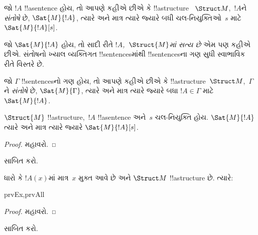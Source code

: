 \documentclass[../../../include/open-logic-section]{subfiles}
\begin{document}
\begin{defn}
જો $!A$ !!a{sentence} હોય, તો આપણે કહીએ છીએ કે !!a{structure}
~$\Struct M$,~$!A$ને \emph{સંતોષે} છે, $\Sat{M}{!A}$, ત્યારે અને માત્ર
ત્યારે જ્યારે બધી ચલ-નિયુક્તિઓ~$s$ માટે $\Sat{M}{!A}[s]$.
\end{defn}

જો $\Sat{M}{!A}$ હોય, તો સાદી રીતે \emph{$!A$,~$\Struct{M}$માં સત્ય
છે} એમ પણ કહીએ છીએ. સંતોષનો ખ્યાલ વ્યક્તિગત !!{sentence}sમાંથી
!!{sentence}sના ગણ સુધી સ્વાભાવિક રીતે વિસ્તરે છે.

\begin{defn}
જો $\Gamma$ !!{sentence}sનો ગણ હોય, તો આપણે કહીએ છીએ કે
!!a{structure}~$\Struct M$,~$\Gamma$ને \emph{સંતોષે} છે,
$\Sat{M}{\Gamma}$, ત્યારે અને માત્ર ત્યારે જ્યારે બધા
$!A \in \Gamma$ માટે $\Sat{M}{!A}$.
\end{defn}

\begin{prop}
  $\Struct{M}$ !!a{structure},~$!A$ !!a{sentence} અને~$s$ ચલ-નિયુક્તિ
  હોય. $\Sat{M}{!A}$ ત્યારે અને માત્ર ત્યારે જ્યારે
  $\Sat{M}{!A}[s]$.
\end{prop}

\begin{proof}
મહાવરો.
\end{proof}

\begin{prob}
 સાબિત કરો.
\end{prob}

\begin{prop}
  ધારો કે $!A(x)$માં માત્ર~$x$ મુક્ત આવે છે અને $\Struct M$
  !!a{structure} છે. ત્યારે:
  \begin{tagenumerate}{prvEx,prvAll}
\end{tagenumerate}
\end{prop}

\begin{proof}
મહાવરો.
\end{proof}

\begin{prob}
 સાબિત કરો.
\end{prob}
\end{document}
